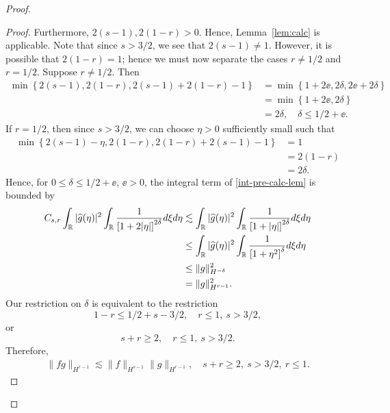 \begin{proof}
\begin{proof}
%
%
Furthermore, $2(s-1), 2(1-r) > 0$. Hence, Lemma~\ref{lem:calc} is applicable. 
Note that since $s > 3/2$, we see that $2(s-1) \neq 1$. However, it is possible that $2(1-r) =1$; hence we must now separate the cases $r \neq 1/2$ and $r = 1/2$. Suppose $r \neq 1/2$. Then 
%
%
\begin{equation*}
\begin{split}
  \min\left\{ 2(s-1), 2(1-r), 2(s-1) + 2(1-r) -1 \right\}
  & = \min\left\{ 1 + 2 \ee, 2 \delta, 2\ee + 2 \delta \right\}
  \\
  & = \min\left\{ 1 + 2 \ee, 2 \delta\right\}
  \\
  & = 2 \delta, \quad \delta \le 1/2 + \ee.
\end{split}
\end{equation*}
%
If $r = 1/2$, then since $s > 3/2$, we can choose $\eta > 0$ sufficiently small
such that
%
%
\begin{equation*}
\begin{split}
  \min\left\{ 2(s-1) -\eta , 2(1-r), 2(1-r) + 2(s-1) - 1  \right\}
  & = 1 
  \\
  & = 2(1 -r)
  \\
  & = 2\delta.
\end{split}
\end{equation*}
%
Hence, for $0 \le \delta \le 1/2 + \ee$, $\ee >
0$, the integral term of \eqref{int-pre-calc-lem} is bounded by
\begin{equation*}
\begin{split}
  C_{s,r} \int_{\mathbb{R}}  | \widehat{g}(\eta) |^{2} \int_{\mathbb{R}} \frac{1}{\left[ 1
  + 2 |\eta| \right]^{2 \delta}} d \xi d \eta 
  & \lesssim
  \int_{\mathbb{R}}  | \widehat{g}(\eta) |^{2} \int_{\mathbb{R}} \frac{1}{\left[ 1
  + |\eta| \right]^{2 \delta}} d \xi d \eta  
  \\
  & \le \int_{\mathbb{R}}  | \widehat{g}(\eta) |^{2} \int_{\mathbb{R}} \frac{1}{\left[ 1
  + \eta^{2} \right]^{\delta}} d \xi d \eta  
  \\
  & \le \| g \|_{H^{-\delta}}^{2}
  \\
  & = \| g \|_{H^{r-1}}^{2}.
\end{split}
\end{equation*}
%
Our restriction on $\delta$ is equivalent to the restriction 
$$1-r \le 1/2 + s - 3/2, \quad r \le 1, \ s > 3/2,$$ or
$$s + r \ge 2,  \quad  r \le 1, \ s > 3/2.$$ Therefore, 
%
%
%
%
\begin{equation}
  \label{yhh}
\begin{split}
  \| f g \|_{H^{r-1}} \lesssim \| f \|_{H^{s-1}} \| g \|_{H^{r-1}},
  \quad s + r \ge 2, \ s > 3/2, \ r \le 1.

\end{split}
\end{equation}
\end{proof}
\end{proof}
